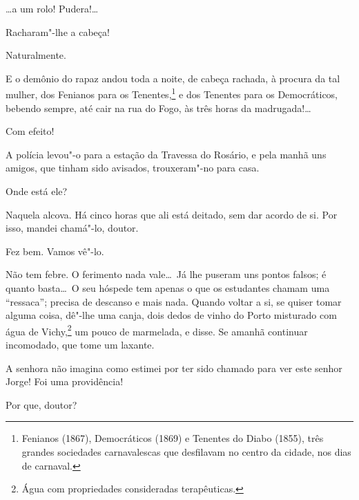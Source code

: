  \ldots a um rolo! Pudera!\ldots

 Racharam"-lhe a cabeça!

 Naturalmente.

 E o demônio do rapaz andou toda a noite, de cabeça
rachada, à procura da tal mulher, dos Fenianos para os Tenentes,\footnote{
Fenianos (1867), Democráticos (1869) e Tenentes do Diabo (1855), três grandes
sociedades carnavalescas que desfilavam no centro da cidade, nos dias de
carnaval.} e dos
Tenentes para os Democráticos, bebendo sempre, até cair na rua do Fogo,
às três horas da madrugada!\ldots

 Com efeito!

 A polícia levou"-o para a estação da Travessa do Rosário, e
pela manhã uns amigos, que tinham sido avisados, trouxeram"-no para
casa.

 Onde está ele?

 Naquela alcova. Há cinco horas que ali está deitado, sem
dar acordo de si. Por isso, mandei chamá"-lo, doutor.

 Fez bem. Vamos vê"-lo. 



  Não tem febre.
 O ferimento nada vale\ldots\ Já
lhe puseram uns pontos falsos; é quanto basta\ldots\ O seu hóspede tem
apenas o que os estudantes chamam uma “ressaca”; precisa de descanso e
mais nada. Quando voltar a si, se quiser tomar alguma coisa, dê"-lhe uma
canja, dois dedos de vinho do Porto misturado com água de
Vichy,\footnote{ Água com propriedades consideradas terapêuticas.} 
um pouco de marmelada, e disse. Se amanhã continuar
incomodado, que tome um laxante.



  A senhora não imagina como
estimei por ter sido chamado para ver este senhor Jorge! Foi uma
providência!

 Por que, doutor?

